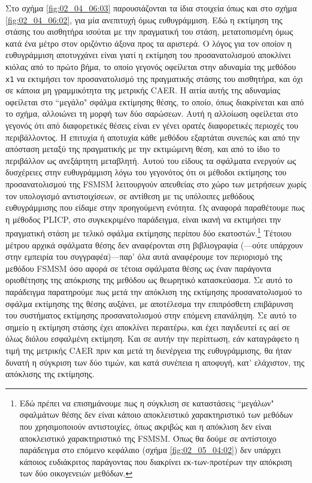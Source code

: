 Στο σχήμα \ref{fig:02_04_06:03} παρουσιάζονται τα ίδια στοιχεία όπως και στο
σχήμα \ref{fig:02_04_06:02}, για μία ανεπιτυχή όμως ευθυγράμμιση. Εδώ η
εκτίμηση της στάσης του αισθητήρα ισούται με την πραγματική του στάση,
μετατοπισμένη όμως κατά ένα μέτρο στον οριζόντιο άξονα προς τα αριστερά. Ο
λόγος για τον οποίον η ευθυγράμμιση αποτυγχάνει είναι γιατί η εκτίμηση του
προσανατολισμού αποκλίνει κιόλας από το πρώτο βήμα, το οποίο γεγονός οφείλεται
στην αδυναμία της μεθόδου \texttt{x1} να εκτιμήσει τον προσανατολισμό της
πραγματικής στάσης του αισθητήρα, και όχι σε κάποια μη γραμμικότητα της
μετρικής CAER. Η αιτία αυτής της αδυναμίας οφείλεται στο ``μεγάλο" σφάλμα
εκτίμησης θέσης, το οποίο, όπως διακρίνεται και από το σχήμα, αλλοιώνει τη
μορφή των δύο σαρώσεων. Αυτή η αλλοίωση οφείλεται στο γεγονός ότι από
διαφορετικές θέσεις είναι εν γένει ορατές διαφορετικές περιοχές του
περιβάλλοντος.  Η επιτυχία ή αποτυχία κάθε μεθόδου εξαρτάται συνεπώς και από
την απόσταση μεταξύ της πραγματικής με την εκτιμώμενη θέση, και από το ίδιο το
περιβάλλον ως ανεξάρτητη μεταβλητή.  Αυτού του είδους τα σφάλματα ενεργούν ως
δυσχέρειες στην ευθυγράμμιση λόγω του γεγονότος ότι οι μέθοδοι εκτίμησης του
προσανατολισμού της FSMSM λειτουργούν απευθείας στο χώρο των μετρήσεων χωρίς
τον υπολογισμό αντιστοιχίσεων, σε αντίθεση με τις υπόλοιπες μεθόδους
ευθυγράμμισης που είδαμε στην προηγούμενη ενότητα. Ως αναφορά παραθέτουμε πως η
μέθοδος PLICP, στο συγκεκριμένο παράδειγμα, είναι ικανή να εκτιμήσει την
πραγματική στάση με τελικό σφάλμα εκτίμησης περίπου δύο εκατοστών.\footnote{Εδώ
πρέπει να επισημάνουμε πως η σύγκλιση σε καταστάσεις ``μεγάλων" σφαλμάτων θέσης
δεν είναι κάποιο αποκλειστικό χαρακτηριστικό των μεθόδων που χρησιμοποιούν
αντιστοιχίες, όπως ακριβώς και η απόκλιση δεν είναι αποκλειστικό χαρακτηριστικό
της FSMSM.  Όπως θα δούμε σε αντίστοιχο παράδειγμα στο επόμενο κεφάλαιο (σχήμα
\ref{fig:02_05_04:02}) δεν υπάρχει κάποιος ευδιάκριτος παράγοντας που διακρίνει
εκ-των-προτέρων την απόκριση των δύο οικογενειών μεθόδων.} Τέτοιου μέτρου
αρχικά σφάλματα θέσης δεν αναφέρονται στη βιβλιογραφία (---ούτε υπάρχουν στην
εμπειρία του συγγραφέα)---παρ' όλα αυτά αναφέρουμε τον περιορισμό της μεθόδου
FSMSM όσο αφορά σε τέτοια σφάλματα θέσης ως έναν παράγοντα οριοθέτησης της
απόκρισης της μεθόδου ως θεωρητικό κατασκεύασμα. Σε αυτό το παράδειγμα
παρατηρούμε πως μετά την απόκλιση της εκτίμησης προσανατολισμού το σφάλμα
εκτίμησης της θέσης αυξάνει, με αποτέλεσμα την επιπρόσθετη επιβάρυνση του
συστήματος εκτίμησης προσανατολισμού στην επόμενη επανάληψη. Σε αυτό το σημείο
η εκτίμηση στάσης έχει αποκλίνει περαιτέρω, και έχει παγιδευτεί ες αεί σε όλως
διόλου εσφαλμένη εκτίμηση. Και σε αυτήν την περίπτωση, εάν καταγράφετο η τιμή
της μετρικής CAER πριν και μετά τη διενέργεια της ευθυγράμμισης, θα ήταν δυνατή
η σύγκριση των δύο τιμών, και κατά συνέπεια η αποφυγή, κατ' ελάχιστον, της
απόκλισης της εκτίμησης.

